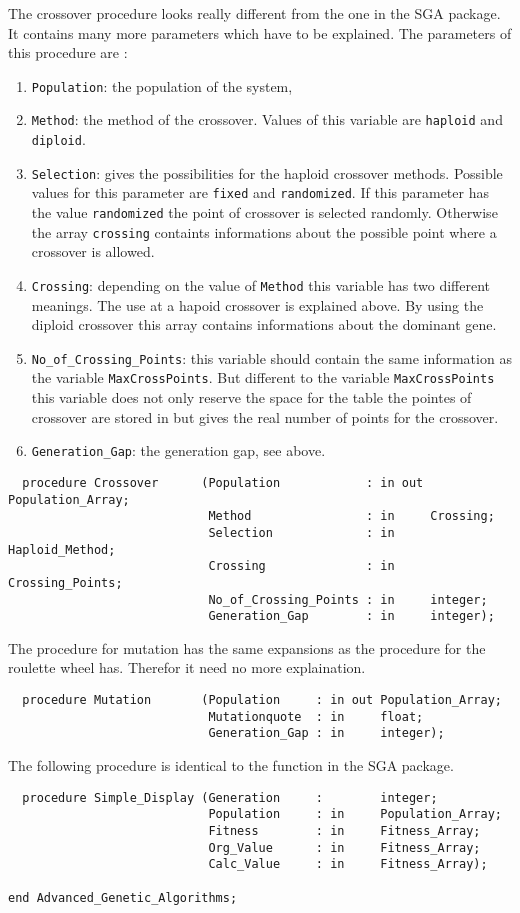 The crossover procedure looks really different from the one in the SGA package.
It contains many more parameters which have to be explained. The parameters of
this procedure are :
\begin{enumerate}
  \item {\tt Population}: the population of the system,
  \item {\tt Method}: the method of the crossover. Values of this variable are
  {\tt haploid} and {\tt diploid}.
  \item {\tt Selection}: gives the possibilities for the haploid crossover
  methods. Possible values for this parameter are {\tt fixed} and {\tt randomized}.
  If this parameter has the value {\tt randomized} the point of crossover is
  selected randomly. Otherwise the array {\tt crossing} containts informations
  about the possible point where a crossover is allowed.
  \item {\tt Crossing}: depending on the value of {\tt Method} this variable
  has two different meanings. The use at a hapoid crossover is explained above.
  By using the diploid crossover this array contains informations about the dominant
  gene.
  \item {\tt No\_of\_Crossing\_Points}: this variable should contain the same
  information as the variable {\tt MaxCrossPoints}. But different to the variable
  {\tt MaxCrossPoints} this variable does not only reserve the space for the
  table the pointes of crossover are stored in but gives the real number of
  points for the crossover.
  \item {\tt Generation\_Gap}: the generation gap, see above.
\end{enumerate}
\begin{verbatim}
  procedure Crossover      (Population            : in out Population_Array;
                            Method                : in     Crossing;
                            Selection             : in     Haploid_Method;
                            Crossing              : in     Crossing_Points;
                            No_of_Crossing_Points : in     integer;
                            Generation_Gap        : in     integer);
\end{verbatim}
The procedure for mutation has the same expansions as the procedure for the
roulette wheel has. Therefor it need no more explaination.
\begin{verbatim}
  procedure Mutation       (Population     : in out Population_Array;
                            Mutationquote  : in     float;
                            Generation_Gap : in     integer);
\end{verbatim}
The following procedure is identical to the function in the SGA package.
\begin{verbatim}
  procedure Simple_Display (Generation     :        integer;
                            Population     : in     Population_Array;
                            Fitness        : in     Fitness_Array;
                            Org_Value      : in     Fitness_Array;
                            Calc_Value     : in     Fitness_Array);

end Advanced_Genetic_Algorithms;
\end{verbatim}

